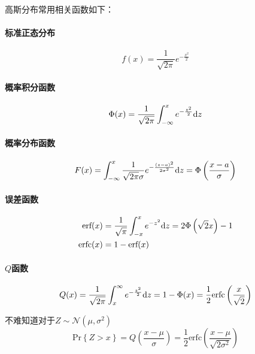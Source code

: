     高斯分布常用相关函数如下：
    \paragraph{标准正态分布}\mbox{}
    \vspace{-3ex}
    \begin{equation}
        f(x)=\frac{1}{\sqrt{2\pi}}e^{-\frac{x^2}{2}}
    \end{equation}
    \paragraph{概率积分函数}\mbox{}
    \vspace{-3ex}
    \begin{equation}
        \Phi(x)=\frac{1}{\sqrt{2\pi}}\int_{-\infty}^{x}e^{-\frac{z^2}{2}}\text{\upshape d} z
    \end{equation}
    \paragraph{概率分布函数}\mbox{}
    \vspace{-3ex}
    \begin{equation}
        F(x)=\int_{-\infty}^{x}\frac{1}{\sqrt{2\pi}\sigma}e^{-\frac{(z-a)^2}{2\sigma^2}}\text{\upshape d} z=\Phi\left(\frac{x-a}{\sigma}\right)
    \end{equation}
    \paragraph{误差函数}\mbox{}
    \vspace{-3ex}
    \begin{align}
        \text{erf}(x)&=\frac{1}{\sqrt{\pi}}\int_{-x}^{x}e^{-z^2}\text{\upshape d} z=2\Phi\left(\sqrt{2}x\right)-1\\
        \text{erfc}(x)&=1-\text{erf}(x)
    \end{align}
    \paragraph{$Q$函数}\mbox{}
    \vspace{-3ex}
    \begin{equation}
        Q(x)=\frac{1}{\sqrt{2\pi}}\int_{x}^{\infty}e^{-\frac{z^2}{2}}\text{\upshape d} z=1-\Phi(x)=\frac{1}{2}\text{erfc}\left(\frac{x}{\sqrt{2}}\right)
    \end{equation}

    不难知道对于$Z\sim \mathscr{N}(\mu,\sigma^2)$
    \begin{equation}
        \text{Pr}\left\{Z>x\right\}=Q\left(\frac{x-\mu}{\sigma}\right)=\frac{1}{2}\text{erfc}\left(\frac{x-\mu}{\sqrt{2\sigma^2}}\right)
    \end{equation}
